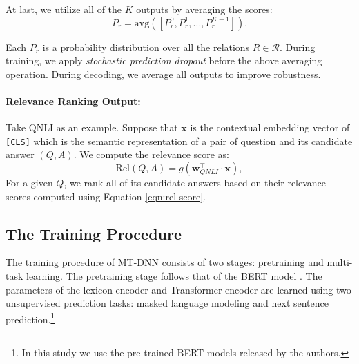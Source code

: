 At last, we utilize all of the $K$ outputs by averaging the scores:
\begin{equation}
P_r = \text{avg} ([P_r^0, P_r^1, ..., P_r^{K-1}]).
\label{eqn:pairwise-text-classification-avg}
\end{equation}

Each $P_r$ is a probability distribution over all the relations $R \in \mathcal{R}$. 
During training, we apply \emph{stochastic prediction dropout} \citep{liu2018san} before the above averaging operation. 
During decoding, we average all outputs to improve robustness.

\paragraph{Relevance Ranking Output:}
Take QNLI as an example. Suppose that $\mathbf{x}$ is the contextual embedding vector of \texttt{[CLS]} which is the semantic representation of a pair of question and its candidate answer $(Q, A)$. 
We compute the relevance score as: 
\begin{equation}
\text{Rel} (Q, A)= g (\mathbf{w}_{QNLI}^\top \cdot \mathbf{x}),
\label{eqn:rel-score}
\end{equation}
For a given $Q$, we rank all of its candidate answers based on their relevance scores computed using Equation \ref{eqn:rel-score}.

\subsection{The Training Procedure}

The training procedure of MT-DNN consists of two stages: pretraining and multi-task learning. The pretraining stage follows that of the BERT model \citep{bert2018}. The parameters of the lexicon encoder and Transformer encoder are learned using two unsupervised prediction tasks: masked language modeling and next sentence prediction.\footnote{In this study we use the pre-trained BERT models released by the authors.}

